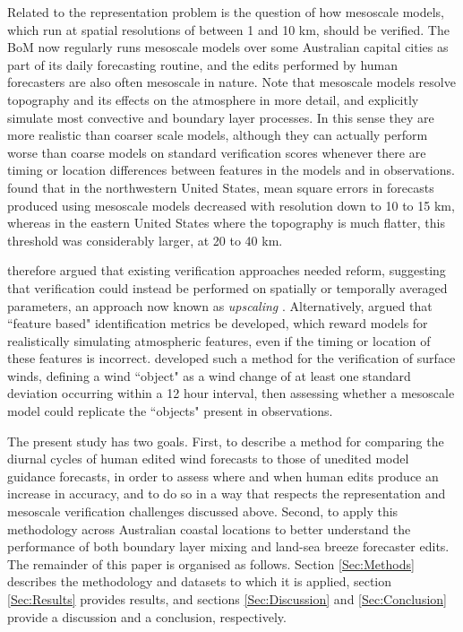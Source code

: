 \documentclass[twocol]{ametsoc}
\begin{document}
Related to the representation problem is the question of how mesoscale models, which run at spatial resolutions of between 1 and 10 km, should be verified. The BoM now regularly runs mesoscale models over some Australian capital cities as part of its daily forecasting routine, and the edits performed by human forecasters are also often mesoscale in nature. Note that mesoscale models resolve topography and its effects on the atmosphere in more detail, and explicitly simulate most convective and boundary layer processes. In this sense they are more realistic than coarser scale models, although they can actually perform worse than coarse models on standard verification scores whenever there are timing or location differences between features in the models and in observations. \citet{mass02} found that in the northwestern United States, mean square errors in forecasts produced using mesoscale models decreased with resolution down to 10 to 15 km, whereas in the eastern United States where the topography is much flatter, this threshold was considerably larger, at 20 to 40 km. 

\citet{mass02} therefore argued that existing verification approaches needed reform, suggesting that verification could instead be performed on spatially or temporally averaged parameters, an approach now known as \textit{upscaling} \citep{ebert08}. Alternatively, \citet{mass02} argued that ``feature based" identification metrics be developed, which reward models for realistically simulating atmospheric features, even if the timing or location of these features is incorrect. \citet{rife05} developed such a method for the verification of surface winds, defining a wind ``object" as a wind change of at least one standard deviation occurring within a 12 hour interval, then assessing whether a mesoscale model could replicate the ``objects" present in observations.   

The present study has two goals. First, to describe a method for comparing the diurnal cycles of human edited wind forecasts to those of unedited model guidance forecasts, in order to assess where and when human edits produce an increase in accuracy, and to do so in a way that respects the representation and mesoscale verification challenges discussed above. Second, to apply this methodology across Australian coastal locations to better understand the performance of both boundary layer mixing and land-sea breeze forecaster edits. The remainder of this paper is organised as follows. Section \ref{Sec:Methods} describes the methodology and datasets to which it is applied, section \ref{Sec:Results} provides results, and sections \ref{Sec:Discussion} and \ref{Sec:Conclusion} provide a discussion and a conclusion, respectively.
\end{document}
